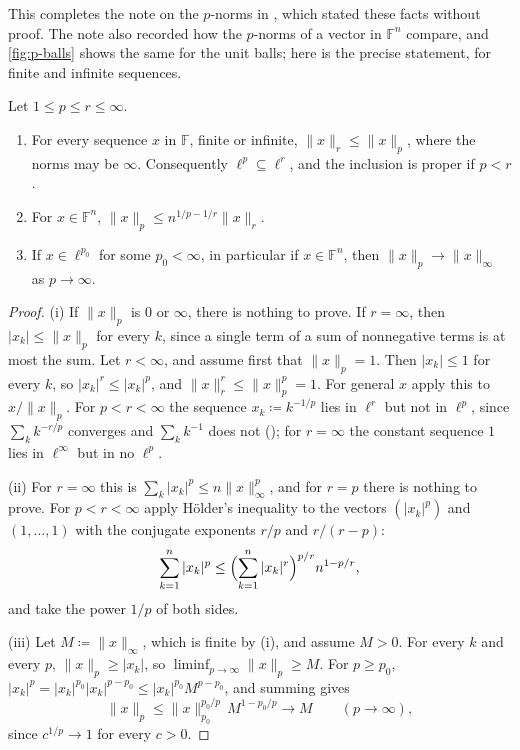 This completes the note on the $p$-norms in , which stated these facts without proof. The note also recorded how the $p$-norms of a vector in $\mathbb F^n$ compare, and \cref{fig:p-balls} shows the same for the unit balls; here is the precise statement, for finite and infinite sequences.

\begin{proposition}
\label{prop:p-norm-monotone}
Let $1\le p\le r\le\infty$.
\begin{enumerate}
\item For every sequence $x$ in $\mathbb F$, finite or infinite, $\|x\|_r\le\|x\|_p$, where the norms may be $\infty$. Consequently $\ell^p\subseteq\ell^r$, and the inclusion is proper if $p<r$.
\item For $x\in\mathbb F^n$, $\|x\|_p\le n^{1/p-1/r}\|x\|_r$.
\item If $x\in\ell^{p_0}$ for some $p_0<\infty$, in particular if $x\in\mathbb F^n$, then $\|x\|_p\to\|x\|_\infty$ as $p\to\infty$.
\end{enumerate}
\end{proposition}

\begin{proof}
(i) If $\|x\|_p$ is $0$ or $\infty$, there is nothing to prove. If $r=\infty$, then $|x_k|\le\|x\|_p$ for every $k$, since a single term of a sum of nonnegative terms is at most the sum. Let $r<\infty$, and assume first that $\|x\|_p=1$. Then $|x_k|\le1$ for every $k$, so $|x_k|^r\le|x_k|^p$, and $\|x\|_r^r\le\|x\|_p^p=1$. For general $x$ apply this to $x/\|x\|_p$. For $p<r<\infty$ the sequence $x_k\coloneqq k^{-1/p}$ lies in $\ell^r$ but not in $\ell^p$, since $\sum_kk^{-r/p}$ converges and $\sum_kk^{-1}$ does not (); for $r=\infty$ the constant sequence $1$ lies in $\ell^\infty$ but in no $\ell^p$.

(ii) For $r=\infty$ this is $\sum_k|x_k|^p\le n\|x\|_\infty^p$, and for $r=p$ there is nothing to prove. For $p<r<\infty$ apply H\"older's inequality to the vectors $(|x_k|^p)$ and $(1,\ldots,1)$ with the conjugate exponents $r/p$ and $r/(r-p)$:
\[
\sum_{k=1}^n|x_k|^p\le\Bigl(\sum_{k=1}^n|x_k|^r\Bigr)^{p/r}n^{1-p/r},
\]
and take the power $1/p$ of both sides.

(iii) Let $M\coloneqq\|x\|_\infty$, which is finite by (i), and assume $M>0$. For every $k$ and every $p$, $\|x\|_p\ge|x_k|$, so $\liminf_{p\to\infty}\|x\|_p\ge M$. For $p\ge p_0$, $|x_k|^p=|x_k|^{p_0}|x_k|^{p-p_0}\le|x_k|^{p_0}M^{p-p_0}$, and summing gives
\[
\|x\|_p\le\|x\|_{p_0}^{p_0/p}\,M^{1-p_0/p}\to M\qquad(p\to\infty),
\]
since $c^{1/p}\to1$ for every $c>0$.
\end{proof}

